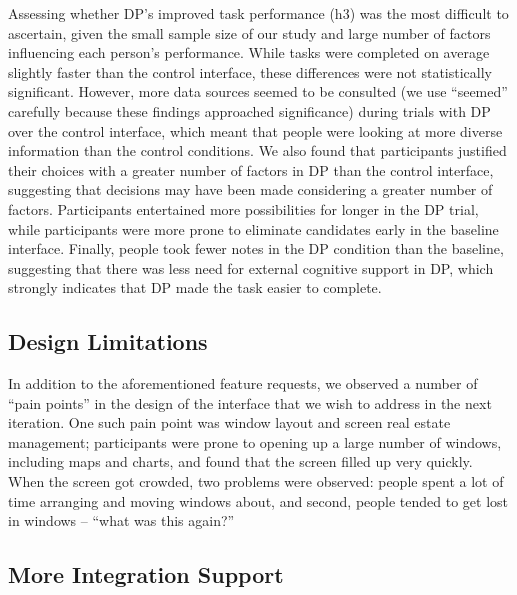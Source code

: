 \documentclass{sigchi}
\begin{document}
Assessing whether DP's improved task performance (h3) was the most difficult to ascertain, given the small sample size of our study and large number of factors influencing each person's performance.  While tasks were completed on average slightly faster than the control interface, these differences were not statistically significant.  However, more data sources seemed to be consulted (we use ``seemed'' carefully because these findings approached significance) during trials with DP over the control interface, which meant that people were looking at more diverse information than the control conditions.  We also found that participants justified their choices with a greater number of factors in DP than the control interface, suggesting that decisions may have been made considering a greater number of factors.  Participants entertained more possibilities for longer in the DP trial, while participants were more prone to eliminate candidates early in the baseline interface.  Finally, people took fewer notes in the DP condition than the baseline, suggesting that there was less need for external cognitive support in DP, which strongly indicates that DP made the task easier to complete.


\subsection{Design Limitations}

In addition to the aforementioned feature requests, we observed a number of ``pain points'' in the design of the interface that we wish to address in the next iteration.  One such pain point was window layout and screen real estate management; participants were prone to opening up a large number of windows, including maps and charts, and found that the screen filled up very quickly.  When the screen got crowded, two problems were observed: people spent a lot of time arranging and moving windows about, and second, people tended to get lost in windows -- ``what was this again?''

\subsection{More Integration Support}

\end{document}
